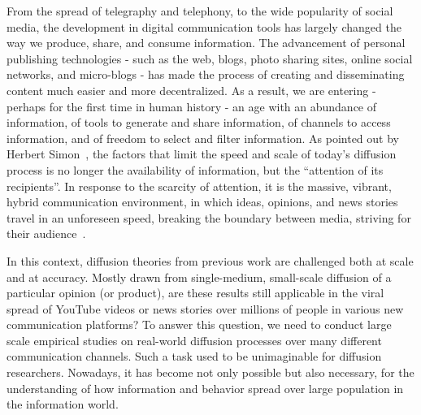 \documentclass[phd,tocprelim]{cornell}
\begin{document}
From the spread of telegraphy and telephony, to the wide popularity of social media, the development in digital communication tools has largely changed the way we produce, share, and consume information. The advancement of personal publishing technologies - such as the web, blogs, photo sharing sites, online social networks, and micro-blogs - has made the process of creating and disseminating content much easier and more decentralized. As a result, we are entering - perhaps for the first time in human history - an age with an abundance of information, of tools to generate and share information, of channels to access information, and of freedom to select and filter information. As pointed out by Herbert Simon~\cite{Simon-1971}, the factors that limit the speed and scale of today's diffusion process is no longer the availability of information, but the ``attention of its recipients''. In response to the scarcity of attention, it is the massive, vibrant, hybrid communication environment, in which ideas, opinions, and news stories travel in an unforeseen speed, breaking the boundary between media, striving for their audience~\cite{Leskovec-Newscycle-2009}.




In this context, diffusion theories from previous work are challenged both at scale and at accuracy. Mostly drawn from single-medium, small-scale diffusion of a particular opinion (or product), are these results still applicable in the  viral spread of YouTube videos or news stories over millions of people in various new communication platforms? To answer this question, we need to conduct large scale empirical studies on real-world diffusion processes over many different communication channels. Such a task used to be unimaginable for diffusion researchers. Nowadays, it has become not only possible but also necessary, for the understanding of how information and behavior spread over large population in the information world. 
\end{document}

